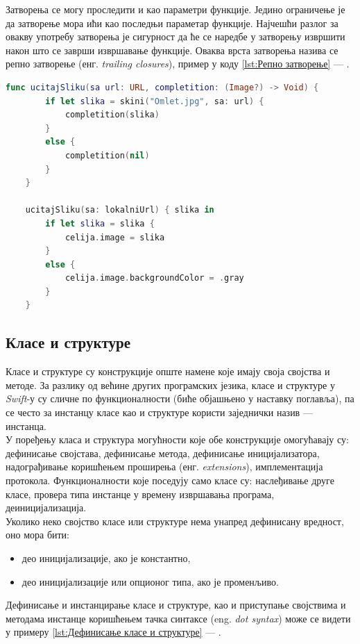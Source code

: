 \documentclass[12pt,oneside]{memoir}
\begin{document}
\indent Затворења се могу проследити и као параметри функције. Једино ограничење је да затворење мора ићи као последњи параметар функције. Најчешћи разлог за овакву употребу затворења је сигурност да ће се наредбе у затворењу извршити након што се заврши извршавање функције. Оваква врста затворења назива се репно затворење (енг. \textit{trailing closures}), пример у коду \ref{lst:Репно затворење} --- .

\begin{lstlisting}[caption=\textit{{Репно затворење}}, label={lst:Репно затворење}, language=Swift, frame=single]
    func ucitajSliku(sa url: URL, completition: (Image?) -> Void) {
        if let slika = skini("Omlet.jpg", sa: url) {
            completition(slika)
        }
        else {
            completition(nil)
        }
    }
    
    ucitajSliku(sa: lokalniUrl) { slika in
        if let slika = slika {
            celija.image = slika
        }
        else {
            celija.image.backgroundColor = .gray
        }
    }
\end{lstlisting}

\subsection{Класе и структуре}

\indent Класе и структуре су конструкције опште намене које имају своја својства и методе. За разлику од већине других програмских језика, класе и структуре у \textit{Swift}-у су сличне по функционалности (биће објашњено у наставку поглавља), па се често за инстанцу класе као и структуре користи заједнички назив --- инстанца. 
\\
\indent У поређењу класа и структура могућности које обе конструкције омогућавају су: дефинисање својстава, дефинисање метода, дефинисање иницијализатора, надограђивање коришћењем проширења (енг. \textit{extensions}), имплементација протокола. Функционалности које поседују само класе су: наслеђивање друге класе, провера типа инстанце у времену извршавања програма, деиницијализација.
\\
\indent Уколико неко својство класе или структуре нема унапред дефинисану вредност, оно мора бити: 
\begin{itemize}
    \item део иницијализације, ако је константно,
    \item део иницијализације или опционог типа, ако је променљиво.
\end{itemize}
Дефинисање и инстанцирање класе и структуре, као и приступање својствима и методама инстанце коришћењем тачка синтаксе (eng. \textit{dot syntax}) може се видети у примеру \ref{lst:Дефинисање класе и структуре} --- .
\end{document}
